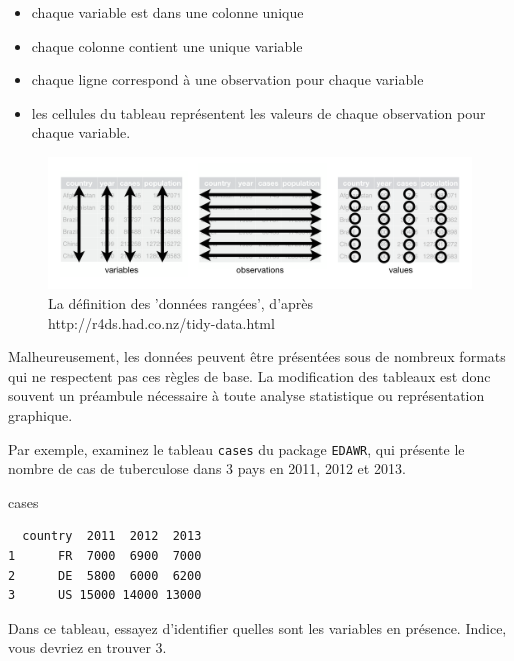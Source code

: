\documentclass[a4paperpaper,]{article}
\newenvironment{Shaded}{\begin{snugshade}}{\end{snugshade}}
\newcommand{\NormalTok}[1]{\textcolor[rgb]{0.12,0.11,0.11}{#1}}
\providecommand{\tightlist}{%
  \setlength{\itemsep}{0pt}\setlength{\parskip}{0pt}}
\begin{document}
\begin{itemize}
\tightlist
\item
  chaque variable est dans une colonne unique
\item
  chaque colonne contient une unique variable
\item
  chaque ligne correspond à une observation pour chaque variable
\item
  les cellules du tableau représentent les valeurs de chaque observation pour chaque variable.
\end{itemize}

\begin{figure}[htpb]

{\centering \includegraphics[width=0.9\linewidth]{images/tidy} 

}

\caption{La définition des 'données rangées', d'après http://r4ds.had.co.nz/tidy-data.html}\label{fig:tidyschema}
\end{figure}

Malheureusement, les données peuvent être présentées sous de nombreux formats qui ne respectent pas ces règles de base. La modification des tableaux est donc souvent un préambule nécessaire à toute analyse statistique ou représentation graphique.

Par exemple, examinez le tableau \texttt{cases} du package \texttt{EDAWR}, qui présente le nombre de cas de tuberculose dans 3 pays en 2011, 2012 et 2013.

\begin{Shaded}
\begin{Highlighting}[]
\NormalTok{cases}
\end{Highlighting}
\end{Shaded}

\begin{verbatim}
  country  2011  2012  2013
1      FR  7000  6900  7000
2      DE  5800  6000  6200
3      US 15000 14000 13000
\end{verbatim}

Dans ce tableau, essayez d'identifier quelles sont les variables en présence. Indice, vous devriez en trouver 3.
\end{document}
